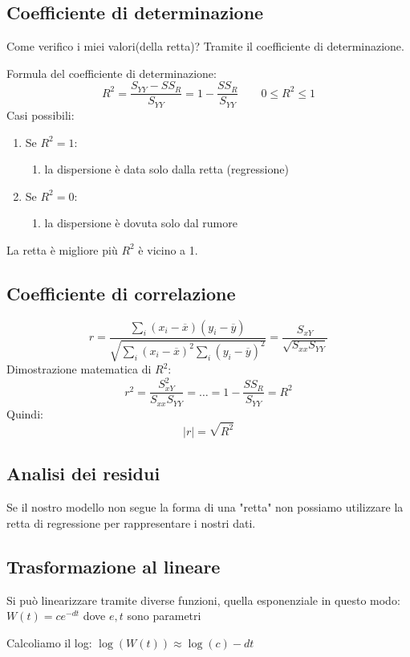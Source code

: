\subsection{Coefficiente di determinazione}\label{sec:coefficiente-di-determinazione}
Come verifico i miei valori(della retta)? Tramite il coefficiente di determinazione.

Formula del coefficiente di determinazione:
\[
 R^2 = \frac{S_{YY}-SS_R}{S_{YY}} = 1- \frac{SS_R}{S_{YY}} \quad  \quad 0 \leq R^2 \leq 1 
\]
Casi possibili:
\begin{enumerate}
\item 
Se $R^2 = 1$:
\begin{enumerate}
\item 
la dispersione è data solo dalla retta (regressione)
\end{enumerate}
\item 
Se $R^2 = 0$:
\begin{enumerate}
\item 
la dispersione è dovuta solo dal rumore
\end{enumerate}
\end{enumerate}

La retta è migliore più $R^2$ è vicino a 1.
\subsection{Coefficiente di correlazione}\label{sec:coefficiente-di-correlazione}\[
 r = \frac{\sum_i (x_i - \overline x)(y_i - \overline y)}{\sqrt{\sum_i (x_i - \overline x)^2 \sum_i(y_i - \overline y)^2}} = \frac{S_{xY}}{\sqrt{S_{xx}S_{YY}}} 
\]
Dimostrazione matematica di $R^2$:
\[
 r^2 = \frac{S_{xY}^2}{S_{xx}S_{YY}} = \ldots = 1- \frac{SS_R}{S_{YY}} = R^2
\]
Quindi:
\[
 |r| = \sqrt{R^2} 
\]\subsection{Analisi dei residui}\label{sec:analisi-dei-residui}
Se il nostro modello non segue la forma di una "retta" non possiamo utilizzare la retta di regressione per rappresentare i nostri dati.
\subsection{Trasformazione al lineare}\label{sec:trasformazione-al-lineare}
Si può linearizzare tramite diverse funzioni, quella esponenziale in questo modo:
$W(t) = ce^{-dt}$ dove $e, t$ sono parametri

Calcoliamo il log:
$\log({W}(t)) \approx \log{(c)}-dt$

